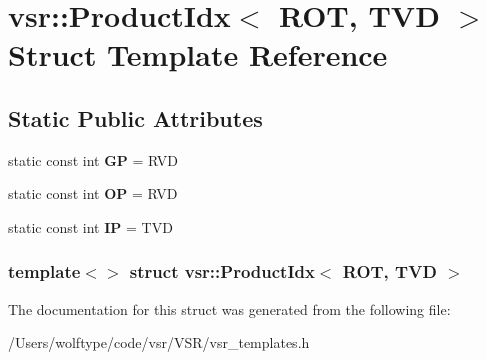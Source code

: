 \hypertarget{structvsr_1_1_product_idx_3_01_r_o_t_00_01_t_v_d_01_4}{\section{vsr\-:\-:Product\-Idx$<$ R\-O\-T, T\-V\-D $>$ Struct Template Reference}
\label{structvsr_1_1_product_idx_3_01_r_o_t_00_01_t_v_d_01_4}
}
\subsection*{Static Public Attributes}
\begin{DoxyCompactItemize}
\item 
\hypertarget{structvsr_1_1_product_idx_3_01_r_o_t_00_01_t_v_d_01_4_ae1138ea827453893186fd6bb32be9812}{static const int {\bfseries G\-P} = R\-V\-D}\label{structvsr_1_1_product_idx_3_01_r_o_t_00_01_t_v_d_01_4_ae1138ea827453893186fd6bb32be9812}

\item 
\hypertarget{structvsr_1_1_product_idx_3_01_r_o_t_00_01_t_v_d_01_4_a4aff04d02e4c618e66f081fe2d5a295a}{static const int {\bfseries O\-P} = R\-V\-D}\label{structvsr_1_1_product_idx_3_01_r_o_t_00_01_t_v_d_01_4_a4aff04d02e4c618e66f081fe2d5a295a}

\item 
\hypertarget{structvsr_1_1_product_idx_3_01_r_o_t_00_01_t_v_d_01_4_abaaa91924939ebd5114a300a1ad50424}{static const int {\bfseries I\-P} = T\-V\-D}\label{structvsr_1_1_product_idx_3_01_r_o_t_00_01_t_v_d_01_4_abaaa91924939ebd5114a300a1ad50424}

\end{DoxyCompactItemize}
\subsubsection*{template$<$$>$ struct vsr\-::\-Product\-Idx$<$ R\-O\-T, T\-V\-D $>$}



The documentation for this struct was generated from the following file\-:\begin{DoxyCompactItemize}
\item 
/\-Users/wolftype/code/vsr/\-V\-S\-R/vsr\-\_\-templates.\-h\end{DoxyCompactItemize}
